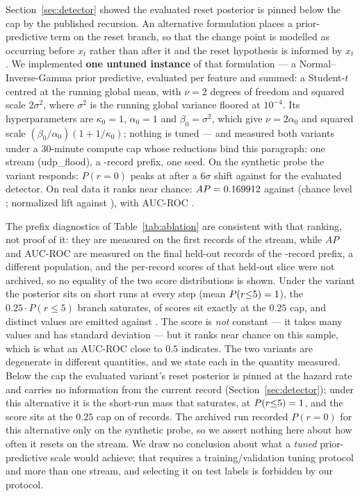 \documentclass[manuscript,screen,nonacm]{acmart}
\begin{document}
Section~\ref{sec:detector} showed the evaluated reset posterior is pinned
below the cap by the published recursion. An alternative formulation places a
prior-predictive term on the reset branch, so that the change point is
modelled as occurring before $x_t$ rather than after it and the reset
hypothesis is informed by $x_t$. We implemented \textbf{one untuned instance}
of that formulation --- a Normal--Inverse-Gamma prior predictive, evaluated per
feature and summed: a Student-$t$ centred at the running global mean, with
$\nu{=}2$ degrees of freedom and squared scale $2\sigma^2$, where $\sigma^2$ is
the running global variance floored at $10^{-4}$. Its hyperparameters are
$\kappa_0{=}1$, $\alpha_0{=}1$ and $\beta_0{=}\sigma^2$, which give
$\nu{=}2\alpha_0$ and squared scale $(\beta_0/\alpha_0)(1+1/\kappa_0)$; nothing
is tuned ---
and measured both variants under a 30-minute compute cap whose reductions bind
this paragraph: one stream (udp\_flood), a \SSixPrefixRows-record prefix, one
seed. On the synthetic probe the variant responds: $P(r{=}0)$ peaks at
\SSixProbeCorrectedPeak{} after a $6\sigma$ shift against
\SSixProbeOriginalPeak{} for the evaluated detector. On real data it ranks near
chance: $AP=0.169912$ against \SSixOriginalAucpr{} (chance level
\SSixChanceFloor; normalized lift \SSixCorrectedNormLift{} against
\SSixOriginalNormLift), with AUC-ROC \SSixCorrectedAucroc.

The prefix diagnostics of Table~\ref{tab:ablation} are consistent with that
ranking, not proof of it: they are measured on the first \SSixDiagWindowRows{}
records of the stream, while $AP$ and AUC-ROC are measured on the final
\SSixTestRows{} held-out records of the \SSixPrefixRows-record prefix, a
different population, and the per-record scores of that held-out slice were
not archived, so no equality of the two score distributions is shown. Under
the variant the posterior sits on
short runs at every step (mean $P(r{\le}5)=1$),
the $0.25\cdot P(r{\le}5)$ branch saturates, \SSixDiagCorrectedFracAtCap{} of
scores sit exactly at the $0.25$ cap, and \SSixDiagCorrectedDistinctScores{}
distinct values are emitted against \SSixDiagOriginalDistinctScores. The score
is \emph{not} constant --- it takes many values and has standard deviation
\SSixDiagCorrectedScoreSd{} --- but it ranks near chance on this sample, which
is what an AUC-ROC close to $0.5$ indicates. The two variants are degenerate in
different quantities, and we state each in the quantity measured. Below the cap
the evaluated variant's reset posterior is pinned at the hazard rate and
carries no information from the current record
(Section~\ref{sec:detector}); under this alternative it is the short-run mass
that saturates, at $P(r{\le}5)=1$, and the
score sits at the $0.25$ cap on \SSixDiagCorrectedFracAtCap{} of records. The
archived run recorded $P(r{=}0)$ for this alternative only on the synthetic
probe, so we assert nothing here about how often it resets on the stream. We
draw no conclusion about what a \emph{tuned}
prior-predictive scale would achieve; that requires a training/validation
tuning protocol and more than one stream, and selecting it on test labels is
forbidden by our protocol.
\end{document}
